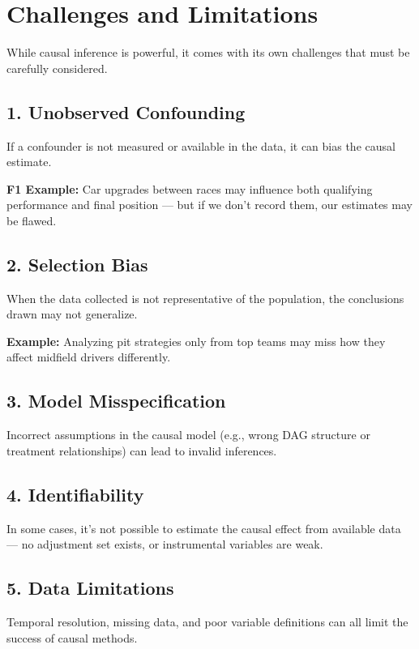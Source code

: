 \documentclass[12pt]{book}
\begin{document}
\section{Challenges and Limitations}

While causal inference is powerful, it comes with its own challenges that must be carefully considered.

\subsection*{1. Unobserved Confounding}

If a confounder is not measured or available in the data, it can bias the causal estimate.

\textbf{F1 Example:} Car upgrades between races may influence both qualifying performance and final position — but if we don’t record them, our estimates may be flawed.

\subsection*{2. Selection Bias}

When the data collected is not representative of the population, the conclusions drawn may not generalize.

\textbf{Example:} Analyzing pit strategies only from top teams may miss how they affect midfield drivers differently.

\subsection*{3. Model Misspecification}

Incorrect assumptions in the causal model (e.g., wrong DAG structure or treatment relationships) can lead to invalid inferences.

\subsection*{4. Identifiability}

In some cases, it's not possible to estimate the causal effect from available data — no adjustment set exists, or instrumental variables are weak.

\subsection*{5. Data Limitations}

Temporal resolution, missing data, and poor variable definitions can all limit the success of causal methods.
\end{document}
